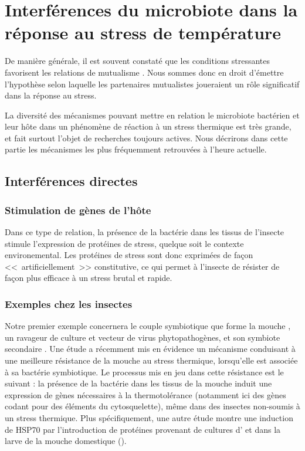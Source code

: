 \chapter{Interférences du microbiote dans la réponse au stress de température} %
	\label{sec:implicationµbiote}

De manière générale, il est souvent constaté que les conditions stressantes favorisent les relations de mutualisme \cite{meadows2013}.
Nous sommes donc en droit d'émettre l'hypothèse selon laquelle les partenaires mutualistes joueraient un rôle significatif dans la réponse au stress.

La diversité des mécanismes pouvant mettre en relation le microbiote bactérien
et leur hôte dans un phénomène de réaction à un stress thermique est très
grande, et fait surtout l'objet de recherches toujours actives. Nous décrirons
dans cette partie les mécanismes les plus fréquemment retrouvées à l'heure
actuelle.


	\section{Interférences directes} %
		\label{sec:direct}

\subsection{Stimulation de gènes de l'hôte} %
\label{sub:genes_hote}

Dans ce type de relation, la présence de la bactérie dans les tissus de
l'insecte stimule l'expression de protéines de stress, quelque soit le
contexte environemental. Les protéines de stress sont donc exprimées de façon
<<~artificiellement~>> constitutive, ce qui permet à l'insecte de résister de façon
plus efficace à un stress brutal et rapide.

\subsection{Exemples chez les insectes} %
\label{sub:exemples}


Notre premier exemple concernera le couple symbiotique que forme la mouche
, un ravageur de culture et vecteur de virus
phytopathogènes, et son symbiote secondaire . Une étude
\cite{brumin2011} a récemment mis en évidence un mécanisme conduisant à une
meilleure résistance de la mouche au stress thermique, lorsqu'elle est
associée à sa bactérie symbiotique. Le processus mis en jeu dans cette
résistance est le suivant : la
présence de la bactérie dans les tissus de la mouche induit une expression de
gènes nécessaires à la thermotolérance (notamment ici des gènes codant pour
des éléments du cytosquelette), même dans des insectes non-soumis à un stress
thermique.
Plus spécifiquement, une autre étude \cite{tang2012} montre une induction de HSP70 par l'introduction de protéines provenant de cultures d' et  dans la larve de la mouche domestique ().

